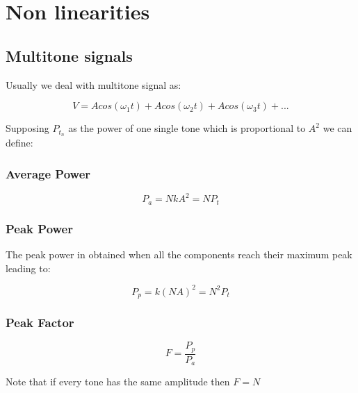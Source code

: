 \chapter{Non linearities} %
\label{cha:non_linearities}

\section{Multitone signals} %
\label{sec:multitone_signals}

Usually we deal with multitone signal as:

\begin{equation}
	V = Acos(\omega_1 t) + Acos(\omega_2t)+Acos(\omega_3t)+...
\end{equation}

Supposing $P_{t_n}$ as the power of one single tone which is proportional to $A^2$ we can define:

\subsection{Average Power} %
\label{ssub:average_power}

\begin{equation}
	P_a= NkA^2 = NP_t 
\end{equation}


\subsection{Peak Power} %
\label{ssub:peak_power}

The peak power in obtained when all the components reach their maximum peak leading to:

\begin{equation}
 	P_p= k (NA)^2= N^2P_t
 \end{equation} 


\subsection{Peak Factor} %
\label{ssub:peak_factor}

\begin{equation}
	F= \frac{P_p}{P_a}
\end{equation}


Note that if every tone has the same amplitude then $F=N$

